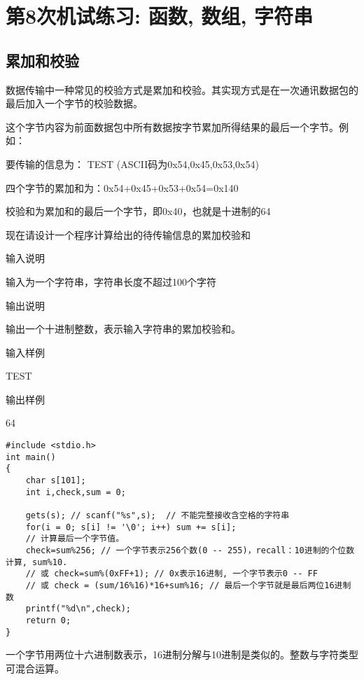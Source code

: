%
%
%
\chapter{第8次机试练习: 函数, 数组, 字符串}

\section{累加和校验}
数据传输中一种常见的校验方式是累加和校验。其实现方式是在一次通讯数据包的最后加入一个字节的校验数据。

这个字节内容为前面数据包中所有数据按字节累加所得结果的最后一个字节。例如： 

要传输的信息为： TEST (ASCII码为0x54,0x45,0x53,0x54)

四个字节的累加和为：0x54+0x45+0x53+0x54=0x140 

校验和为累加和的最后一个字节，即0x40，也就是十进制的64 

现在请设计一个程序计算给出的待传输信息的累加校验和 

输入说明

输入为一个字符串，字符串长度不超过100个字符

输出说明

输出一个十进制整数，表示输入字符串的累加校验和。

输入样例

TEST

输出样例

64

\begin{lstlisting}
#include <stdio.h>
int main()
{
	char s[101];
	int i,check,sum = 0; 
	
	gets(s); // scanf("%s",s);  // 不能完整接收含空格的字符串 
	for(i = 0; s[i] != '\0'; i++) sum += s[i];
	// 计算最后一个字节值。
	check=sum%256; // 一个字节表示256个数(0 -- 255)，recall：10进制的个位数计算, sum%10. 
	// 或 check=sum%(0xFF+1); // 0x表示16进制, 一个字节表示0 -- FF 
	// 或 check = (sum/16%16)*16+sum%16; // 最后一个字节就是最后两位16进制数 
	printf("%d\n",check);
	return 0;
}
\end{lstlisting}

\begin{note}[要点]
	一个字节用两位十六进制数表示，16进制分解与10进制是类似的。整数与字符类型可混合运算。
\end{note}


